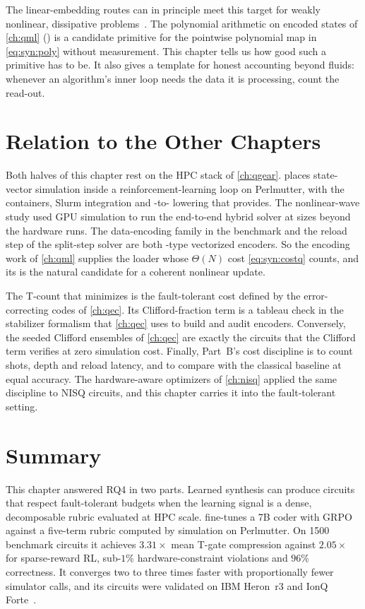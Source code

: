 The linear-embedding routes can in principle meet this target for weakly nonlinear, dissipative problems~\cite{liu2021carleman}. The polynomial arithmetic on encoded states of \cref{ch:qml} (\nnqa{}) is a candidate primitive for the pointwise polynomial map in \cref{eq:syn:poly} without measurement. This chapter tells us how good such a primitive has to be. It also gives a template for honest accounting beyond fluids: whenever an algorithm's inner loop needs the data it is processing, count the read-out.

\section{Relation to the Other Chapters}\label{sec:syn:relation}

Both halves of this chapter rest on the HPC stack of \cref{ch:qgear}. \rubriq{} places \cudaq{} state-vector simulation inside a reinforcement-learning loop on Perlmutter, with the containers, Slurm integration and \qiskit{}-to-\cudaq{} lowering that \qgear{} provides. The nonlinear-wave study used GPU simulation to run the end-to-end hybrid solver at sizes beyond the hardware runs. The data-encoding family in the \rubriq{} benchmark and the reload step of the split-step solver are both \qcrank{}-type vectorized encoders. So the encoding work of \cref{ch:qml} supplies the loader whose $\Theta(N)$ cost \cref{eq:syn:costq} counts, and its \nnqa{} is the natural candidate for a coherent nonlinear update.

The T-count that \rubriq{} minimizes is the fault-tolerant cost defined by the error-correcting codes of \cref{ch:qec}. Its Clifford-fraction term is a tableau check in the stabilizer formalism that \cref{ch:qec} uses to build and audit encoders. Conversely, the seeded Clifford ensembles of \cref{ch:qec} are exactly the circuits that the Clifford term verifies at zero simulation cost. Finally, Part~B's cost discipline is to count shots, depth and reload latency, and to compare with the classical baseline at equal accuracy. The hardware-aware optimizers of \cref{ch:nisq} applied the same discipline to NISQ circuits, and this chapter carries it into the fault-tolerant setting.

\section{Summary}\label{sec:syn:summary}

This chapter answered RQ4 in two parts. Learned synthesis can produce circuits that respect fault-tolerant budgets when the learning signal is a dense, decomposable rubric evaluated at HPC scale. \rubriq{} fine-tunes a 7B coder with GRPO against a five-term rubric computed by \cudaq{} simulation on Perlmutter. On \num{1500} benchmark circuits it achieves $3.31\times$ mean T-gate compression against $2.05\times$ for sparse-reward RL, sub-$1\%$ hardware-constraint violations and $96\%$ correctness. It converges two to three times faster with proportionally fewer simulator calls, and its circuits were validated on IBM Heron~r3 and IonQ Forte~\cite{guo2026rubriq}.

